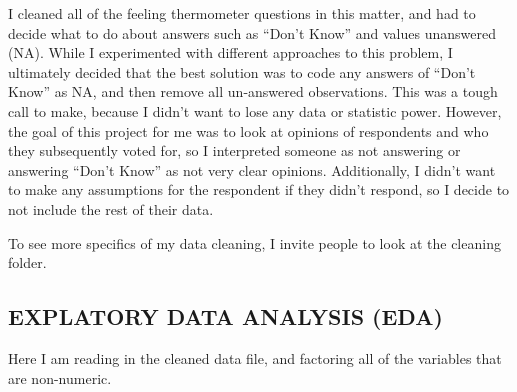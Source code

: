 \documentclass[
]{article}
\begin{document}
I cleaned all of the feeling thermometer questions in this matter, and
had to decide what to do about answers such as ``Don't Know'' and values
unanswered (NA). While I experimented with different approaches to this
problem, I ultimately decided that the best solution was to code any
answers of ``Don't Know'' as NA, and then remove all un-answered
observations. This was a tough call to make, because I didn't want to
lose any data or statistic power. However, the goal of this project for
me was to look at opinions of respondents and who they subsequently
voted for, so I interpreted someone as not answering or answering
``Don't Know'' as not very clear opinions. Additionally, I didn't want
to make any assumptions for the respondent if they didn't respond, so I
decide to not include the rest of their data.

To see more specifics of my data cleaning, I invite people to look at
the cleaning folder.

\hypertarget{explatory-data-analysis-eda}{%
\subsection{EXPLATORY DATA ANALYSIS
(EDA)}\label{explatory-data-analysis-eda}}

Here I am reading in the cleaned data file, and factoring all of the
variables that are non-numeric.
\end{document}
